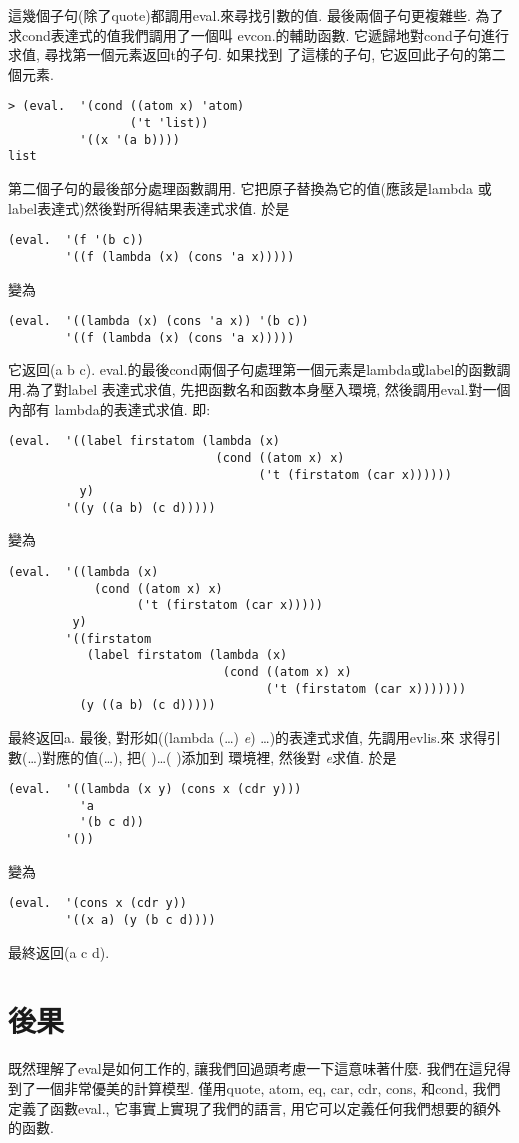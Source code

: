 \documentclass[12pt]{article}
\begin{document}
\begin{CJK}{UTF8}{bsmi}
這幾個子句(除了quote)都調用eval.來尋找引數的值. 
最後兩個子句更複雜些. 
為了求cond表達式的值我們調用了一個叫 
evcon.的輔助函數. 
它遞歸地對cond子句進行求值, 尋找第一個元素返回t的子句. 
如果找到 
了這樣的子句, 
它返回此子句的第二個元素. 
\begin{verbatim} 
> (eval.  '(cond ((atom x) 'atom) 
                 ('t 'list)) 
          '((x '(a b)))) 
list 
\end{verbatim} 
第二個子句的最後部分處理函數調用. 
它把原子替換為它的值(應該是lambda 
或label表達式)然後對所得結果表達式求值. 
於是 
\begin{verbatim} 
(eval.  '(f '(b c)) 
        '((f (lambda (x) (cons 'a x))))) 
\end{verbatim} 
變為 
\begin{verbatim} 
(eval.  '((lambda (x) (cons 'a x)) '(b c)) 
        '((f (lambda (x) (cons 'a x))))) 
\end{verbatim} 
它返回(a b c). 
eval.的最後cond兩個子句處理第一個元素是lambda或label的函數調用.為了對label 
表達式求值, 
先把函數名和函數本身壓入環境, 
然後調用eval.對一個內部有 
lambda的表達式求值. 
即: 
\begin{verbatim} 
(eval.  '((label firstatom (lambda (x) 
                             (cond ((atom x) x) 
                                   ('t (firstatom (car x)))))) 
          y) 
        '((y ((a b) (c d))))) 
\end{verbatim} 
變為 
\begin{verbatim} 
(eval.  '((lambda (x) 
            (cond ((atom x) x) 
                  ('t (firstatom (car x))))) 
         y) 
        '((firstatom 
           (label firstatom (lambda (x) 
                              (cond ((atom x) x) 
                                    ('t (firstatom (car x))))))) 
          (y ((a b) (c d))))) 
\end{verbatim} 
最終返回a. 
最後, 對形如((lambda 
(\pone\dots\pn) 
{\it 
e}) 
\aone\dots\an)的表達式求值, 先調用evlis.來 
求得引數(\aone\dots\an)對應的值(\vone\dots\vn), 把(\pone 
\vone)\dots(\pn 
\vn)添加到 
環境裡, 
然後對{\it 
e}求值. 
於是 
\begin{verbatim} 
(eval.  '((lambda (x y) (cons x (cdr y))) 
          'a 
          '(b c d)) 
        '()) 
\end{verbatim} 
變為 
\begin{verbatim} 
(eval.  '(cons x (cdr y)) 
        '((x a) (y (b c d)))) 
\end{verbatim} 
最終返回(a 
c 
d). 
\section{後果} 
既然理解了eval是如何工作的, 
讓我們回過頭考慮一下這意味著什麼. 
我們在這兒得到了一個非常優美的計算模型. 
僅用quote, atom, eq, car, cdr, cons, 和cond, 
我們定義了函數eval., 它事實上實現了我們的語言, 用它可以定義任何我們想要的額外的函數. 


\end{CJK}
\end{document}
